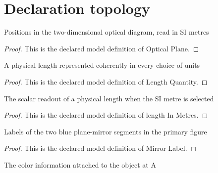 \section{Declaration topology}
\begin{definition}
  \label{def:physics:phyx-mini-0068:phyxminiproblems-problemphyxmini0068-opticalplane}
  Positions in the two-dimensional optical diagram, read in SI metres
\end{definition}
\begin{proof}
  This is the declared model definition of Optical Plane.
\end{proof}
\begin{definition}
  \label{def:physics:phyx-mini-0068:phyxminiproblems-problemphyxmini0068-lengthquantity}
  A physical length represented coherently in every choice of units
\end{definition}
\begin{proof}
  This is the declared model definition of Length Quantity.
\end{proof}
\begin{definition}
  \label{def:physics:phyx-mini-0068:phyxminiproblems-problemphyxmini0068-lengthinmetres}
  The scalar readout of a physical length when the SI metre is selected
\end{definition}
\begin{proof}
  This is the declared model definition of length In Metres.
\end{proof}
\begin{definition}
  \label{def:physics:phyx-mini-0068:phyxminiproblems-problemphyxmini0068-mirrorlabel}
  Labels of the two blue plane-mirror segments in the primary figure
\end{definition}
\begin{proof}
  This is the declared model definition of Mirror Label.
\end{proof}
\begin{definition}
  \label{def:physics:phyx-mini-0068:phyxminiproblems-problemphyxmini0068-ballcolor}
  The color information attached to the object at A
\end{definition}
